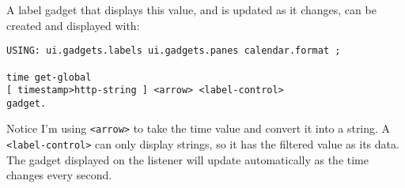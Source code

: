 A label gadget that displays this value, and is updated as it changes,
can be created and displayed with:

\begin{verbatim}
USING: ui.gadgets.labels ui.gadgets.panes calendar.format ;

time get-global 
[ timestamp>http-string ] <arrow> <label-control> 
gadget.
\end{verbatim}

Notice I'm using \verb|<arrow>| to take the time value and convert it into a string. A \verb|<label-control>| can only display strings, so it has the filtered value as its data. The gadget displayed on the listener will update automatically as the time changes every second.

